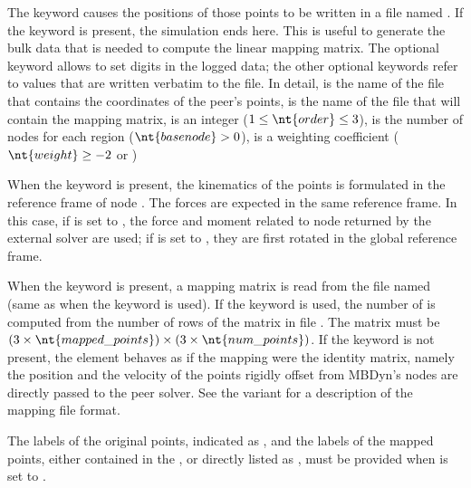 The  keyword causes the positions of those points
to be written in a file named .
If the keyword  is present, the simulation ends here.
This is useful to generate the bulk data that is needed to compute
the linear mapping matrix.
The optional keyword  allows to set 
digits in the logged data; the other optional keywords refer to values
that are written verbatim to the file.
In detail,  is the name of the file that contains
the coordinates of the peer's points, 
is the name of the file that will contain the mapping matrix,
 is an integer ($1 \le \nt{order} \le 3$),
 is the number of nodes for each region ($\nt{basenode} > 0$),
 is a weighting coefficient ($\nt{weight} \ge -2$ or )

When the  keyword is present, the kinematics
of the points is formulated in the reference frame of node
.
The forces are expected in the same reference frame.
In this case, if  is set to ,
the force and moment related to node  
returned by the external solver are used;
if  is set to ,
they are first rotated in the global reference frame.

When the  keyword is present,
a mapping matrix is read from the file named 
(same as  when the  keyword is used).
If the keyword  is used, the number of 
is computed from the number of rows of the matrix
in file .
The matrix must be
$(3 \times \nt{mapped\_points}) \times (3 \times \nt{num\_points})$.
If the  keyword is not present,
the element behaves as if the mapping were the identity matrix,
namely the position and the velocity of the points rigidly offset
from MBDyn's nodes are directly passed to the peer solver.
See the 
variant for a description of the mapping file format.

The labels of the original points, indicated as ,
and the labels of the mapped points, either contained
in the ,
or directly listed as , must be provided
when  is set to .



